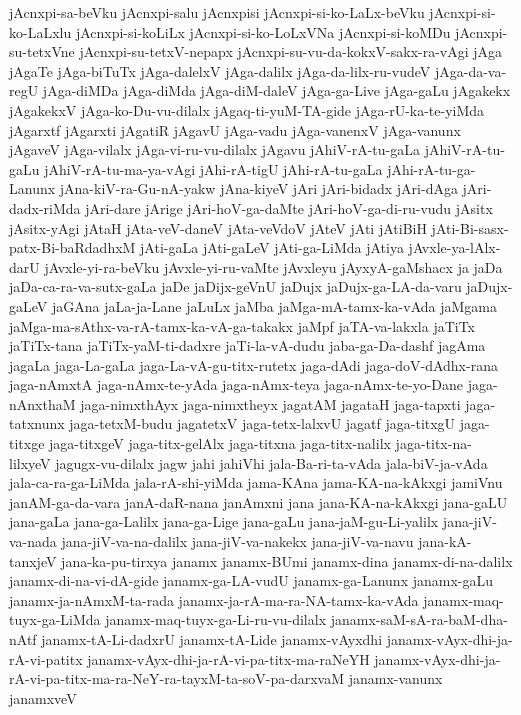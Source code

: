 {jAcnxpi-sa-beVku
jAcnxpi-salu
jAcnxpisi
jAcnxpi-si-ko-LaLx-beVku
jAcnxpi-si-ko-LaLxlu
jAcnxpi-si-koLiLx
jAcnxpi-si-ko-LoLxVNa
jAcnxpi-si-koMDu
jAcnxpi-su-tetxVne
jAcnxpi-su-tetxV-nepapx
jAcnxpi-su-vu-da-kokxV-sakx-ra-vAgi
jAga
jAgaTe
jAga-biTuTx
jAga-dalelxV
jAga-dalilx
jAga-da-lilx-ru-vudeV
jAga-da-va-regU
jAga-diMDa
jAga-diMda
jAga-diM-daleV
jAga-ga-Live
jAga-gaLu
jAgakekx
jAgakekxV
jAga-ko-Du-vu-dilalx
jAgaq-ti-yuM-TA-gide
jAga-rU-ka-te-yiMda
jAgarxtf
jAgarxti
jAgatiR
jAgavU
jAga-vadu
jAga-vanenxV
jAga-vanunx
jAgaveV
jAga-vilalx
jAga-vi-ru-vu-dilalx
jAgavu
jAhiV-rA-tu-gaLa
jAhiV-rA-tu-gaLu
jAhiV-rA-tu-ma-ya-vAgi
jAhi-rA-tigU
jAhi-rA-tu-gaLa
jAhi-rA-tu-ga-Lanunx
jAna-kiV-ra-Gu-nA-yakw
jAna-kiyeV
jAri
jAri-bidadx
jAri-dAga
jAri-dadx-riMda
jAri-dare
jArige
jAri-hoV-ga-daMte
jAri-hoV-ga-di-ru-vudu
jAsitx
jAsitx-yAgi
jAtaH
jAta-veV-daneV
jAta-veVdoV
jAteV
jAti
jAtiBiH
jAti-Bi-sasx-patx-Bi-baRdadhxM
jAti-gaLa
jAti-gaLeV
jAti-ga-LiMda
jAtiya
jAvxle-ya-lAlx-darU
jAvxle-yi-ra-beVku
jAvxle-yi-ru-vaMte
jAvxleyu
jAyxyA-gaMshacx
ja
jaDa
jaDa-ca-ra-va-sutx-gaLa
jaDe
jaDijx-geVnU
jaDujx
jaDujx-ga-LA-da-varu
jaDujx-gaLeV
jaGAna
jaLa-ja-Lane
jaLuLx
jaMba
jaMga-mA-tamx-ka-vAda
jaMgama
jaMga-ma-sAthx-va-rA-tamx-ka-vA-ga-takakx
jaMpf
jaTA-va-lakxla
jaTiTx
jaTiTx-tana
jaTiTx-yaM-ti-dadxre
jaTi-la-vA-dudu
jaba-ga-Da-dashf
jagAma
jagaLa
jaga-La-gaLa
jaga-La-vA-gu-titx-rutetx
jaga-dAdi
jaga-doV-dAdhx-rana
jaga-nAmxtA
jaga-nAmx-te-yAda
jaga-nAmx-teya
jaga-nAmx-te-yo-Dane
jaga-nAnxthaM
jaga-nimxthAyx
jaga-nimxtheyx
jagatAM
jagataH
jaga-tapxti
jaga-tatxnunx
jaga-tetxM-budu
jagatetxV
jaga-tetx-lalxvU
jagatf
jaga-titxgU
jaga-titxge
jaga-titxgeV
jaga-titx-gelAlx
jaga-titxna
jaga-titx-nalilx
jaga-titx-na-lilxyeV
jagugx-vu-dilalx
jagw
jahi
jahiVhi
jala-Ba-ri-ta-vAda
jala-biV-ja-vAda
jala-ca-ra-ga-LiMda
jala-rA-shi-yiMda
jama-KAna
jama-KA-na-kAkxgi
jamiVnu
janAM-ga-da-vara
janA-daR-nana
janAmxni
jana
jana-KA-na-kAkxgi
jana-gaLU
jana-gaLa
jana-ga-Lalilx
jana-ga-Lige
jana-gaLu
jana-jaM-gu-Li-yalilx
jana-jiV-va-nada
jana-jiV-va-na-dalilx
jana-jiV-va-nakekx
jana-jiV-va-navu
jana-kA-tanxjeV
jana-ka-pu-tirxya
janamx
janamx-BUmi
janamx-dina
janamx-di-na-dalilx
janamx-di-na-vi-dA-gide
janamx-ga-LA-vudU
janamx-ga-Lanunx
janamx-gaLu
janamx-ja-nAmxM-ta-rada
janamx-ja-rA-ma-ra-NA-tamx-ka-vAda
janamx-maq-tuyx-ga-LiMda
janamx-maq-tuyx-ga-Li-ru-vu-dilalx
janamx-saM-sA-ra-baM-dha-nAtf
janamx-tA-Li-dadxrU
janamx-tA-Lide
janamx-vAyxdhi
janamx-vAyx-dhi-ja-rA-vi-patitx
janamx-vAyx-dhi-ja-rA-vi-pa-titx-ma-raNeYH
janamx-vAyx-dhi-ja-rA-vi-pa-titx-ma-ra-NeY-ra-tayxM-ta-soV-pa-darxvaM
janamx-vanunx
janamxveV
}
